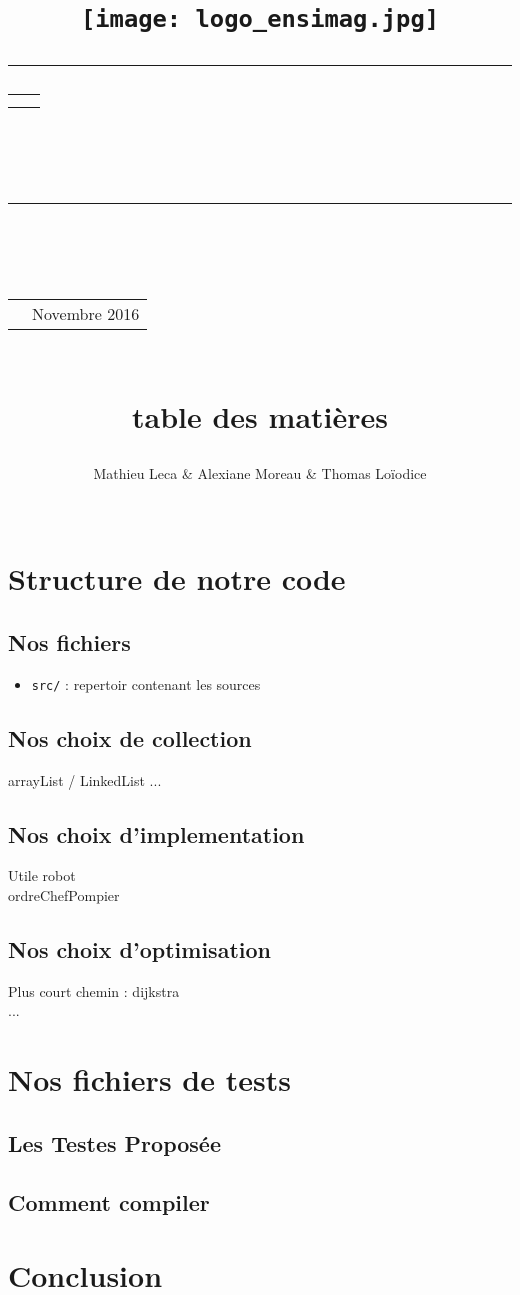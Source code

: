 \documentclass[12pt,a4paper]{article}
\title{
	\begin{flushleft}
		\texttt{[image: logo\_ensimag.jpg]} \\[40pt]
	\end{flushleft} 
	{\rule{\larg}{1mm}}\vspace{7mm}
	\begin{tabular}{p{4cm} r}
	& {\Huge {\bf \typedeprojet}} \\[20pt]
		& {\huge \nomduprojet}
	\end{tabular}\\
		\vspace{5mm}
	{\rule{\larg}{1mm}}
	\vspace{2mm} \\
		\begin{tabular}{p{11cm} r}
	& {\large Novembre 2016} \\[40pt]
	\end{tabular}\\
	 table des matières
	\renewcommand{\contentsname}{\huge \it Sommaire \hfill} %
	\setcounter{tocdepth}{1} %
	\tableofcontents
	\vfill}
\author{\begin{tabular}{p{13.7cm}}
	{\Large Mathieu Leca \& Alexiane Moreau \& Thomas Loïodice}
	\end{tabular} \\
	\hline }
\date{}
\begin{document}
\maketitle
\thispagestyle{empty} %
\newpage

\section{Structure de notre code}

	\subsection{Nos fichiers}

\begin{itemize}[label=\textbullet]
	\item \verb|src/| : repertoir contenant les sources
\end{itemize}

	\subsection{Nos choix de collection}
arrayList / LinkedList ...

	\subsection{Nos choix d'implementation}
Utile robot \\
ordreChefPompier

	\subsection{Nos choix d'optimisation}
Plus court chemin : dijkstra \\
...


\section{Nos fichiers de tests}

	\subsection{Les Testes Proposée}

	\subsection{Comment compiler}

\section{Conclusion}
\end{document}
